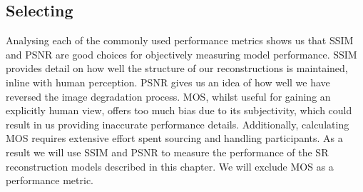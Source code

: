 \subsection{Selecting}
Analysing each of the commonly used performance metrics shows us that SSIM and PSNR are good choices for objectively measuring model performance. SSIM provides detail on how well the structure of our reconstructions is maintained, inline with human perception. PSNR gives us an idea of how well we have reversed the image degradation process. MOS, whilst useful for gaining an explicitly human view, offers too much bias due to its subjectivity, which could result in us providing inaccurate performance details. Additionally, calculating MOS requires extensive effort spent sourcing and handling participants. As a result we will use SSIM and PSNR to measure the performance of the SR reconstruction models described in this chapter. We will exclude MOS as a performance metric.